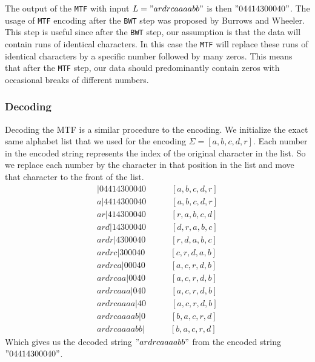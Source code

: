 \documentclass{article}
\begin{document}
The output of the \texttt{MTF} with input \(L = "ardrcaaaabb"\) is then \("04414300040"\). The usage of \texttt{MTF} encoding after the \texttt{BWT} step was proposed by Burrows and Wheeler. This step is useful since after the \texttt{BWT} step, our assumption is that the data will contain runs of identical characters. In this case the \texttt{MTF} will replace these runs of identical characters by a specific number followed by many zeros. This means that after the \texttt{MTF} step, our data should predominantly contain zeros with occasional breaks of different numbers.




\subsubsection{Decoding}
Decoding the MTF is a similar procedure to the encoding. We initialize the exact same alphabet list that we used for the encoding \(\Sigma = [a, b, c, d, r]\). Each number in the encoded string represents the index of the original character in the list. So we replace each number by the character in that position in the list and move that character to the front of the list.  
\begin{align*}
    |04414300040 \quad \quad\quad [a, b, c, d, r] \\
    a|4414300040 \quad \quad\quad [a, b, c, d, r] \\
    ar|414300040 \quad \quad\quad [r, a, b, c, d] \\
    ard|14300040 \quad \quad\quad [d, r, a, b, c] \\
    ardr|4300040 \quad \quad\quad [r, d, a, b, c] \\
    ardrc|300040 \quad \quad\quad [c, r, d, a, b] \\
    ardrca|00040 \quad \quad\quad [a, c, r, d, b] \\
    ardrcaa|0040 \quad \quad\quad [a, c, r, d, b] \\
    ardrcaaa|040 \quad \quad\quad [a, c, r, d, b] \\
    ardrcaaaa|40 \quad \quad\quad [a, c, r, d, b] \\
    ardrcaaaab|0 \quad \quad\quad [b, a, c, r, d] \\
    ardrcaaaabb| \quad \quad\quad [b, a, c, r, d]
\end{align*}
Which gives us the decoded string \("ardrcaaaabb"\) from the encoded string \("04414300040"\).
\end{document}
